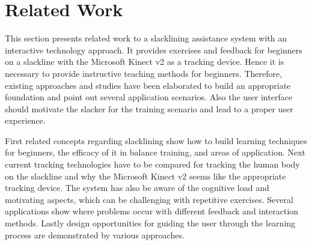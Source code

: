 \chapter{Related Work}\label{2_relatedWork}

This section presents related work to a slacklining assistance system with an interactive technology approach. It provides exercises and feedback for beginners on a slackline with the Microsoft Kinect v2 as a tracking device. Hence it is necessary to provide instructive teaching methods for beginners. Therefore, existing approaches and studies have been elaborated to build an appropriate foundation and point out several application scenarios. Also the user interface should motivate the slacker for the training scenario and lead to a proper user experience.

First related concepts regarding slacklining show how to build learning techniques for beginners, the efficacy of it in balance training, and areas of application. Next current tracking technologies have to be compared for tracking the human body on the slackline and why the Microsoft Kinect v2 seems like the appropriate tracking device. The system has also be aware of the cognitive load and motivating aspects, which can be challenging with repetitive exercises. Several applications show where problems occur with different feedback and interaction methods. Lastly design opportunities for guiding the user through the learning process are demonstrated by various approaches.

\label{2_1_slacklineTraining}

\label{2_2_interactiveTechnology}

\label{2_3_feedbackMethods}

\label{2_4_uiDesign}


\newpage
